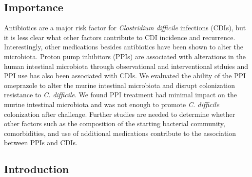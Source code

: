 \documentclass[11pt,]{article}
\begin{document}
\subsection{Importance}\label{importance}

Antibiotics are a major risk factor for \emph{Clostridium difficile}
infections (CDIs), but it is less clear what other factors contribute to
CDI incidence and recurrence. Interestingly, other medications besides
antibiotics have been shown to alter the microbiota. Proton pump
inhibitors (PPIs) are associated with alterations in the human
intestinal microbiota through observational and interventional stduies
and PPI use has also been associated with CDIs. We evaluated the ability
of the PPI omeprazole to alter the murine intestinal microbiota and
disrupt colonization resistance to \emph{C. difficile}. We found PPI
treatment had minimal impact on the murine intestinal microbiota and was
not enough to promote \emph{C. difficile} colonization after challenge.
Further studies are needed to determine whether other factors such as
the composition of the starting bacterial community, comorbidities, and
use of additional medications contribute to the association between PPIs
and CDIs.

\newpage

\subsection{Introduction}\label{introduction}
\end{document}
